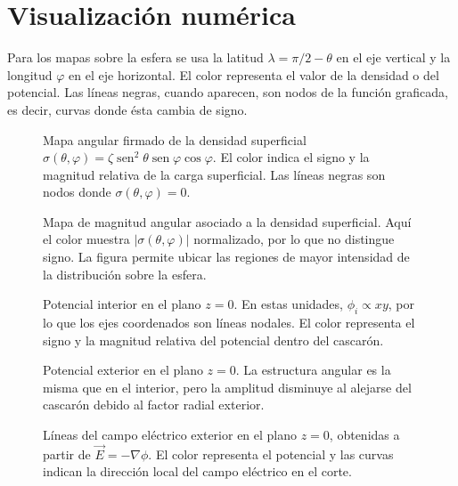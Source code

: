 \documentclass[11pt]{article}
\newcommand{\sen}{\operatorname{sen}}
\begin{document}
\section*{Visualización numérica}

Para los mapas sobre la esfera se usa la latitud $\lambda=\pi/2-\theta$ en el eje vertical y la longitud $\varphi$ en el eje horizontal. El color representa el valor de la densidad o del potencial. Las líneas negras, cuando aparecen, son nodos de la función graficada, es decir, curvas donde ésta cambia de signo.

\begin{figure}[h]
\centering

\caption{Mapa angular firmado de la densidad superficial $\sigma(\theta,\varphi)=\zeta\sen^2\theta\sen\varphi\cos\varphi$. El color indica el signo y la magnitud relativa de la carga superficial. Las líneas negras son nodos donde $\sigma(\theta,\varphi)=0$.}
\end{figure}

\begin{figure}[h]
\centering

\caption{Mapa de magnitud angular asociado a la densidad superficial. Aquí el color muestra $|\sigma(\theta,\varphi)|$ normalizado, por lo que no distingue signo. La figura permite ubicar las regiones de mayor intensidad de la distribución sobre la esfera.}
\end{figure}

\begin{figure}[h]
\centering

\caption{Potencial interior en el plano $z=0$. En estas unidades, $\phi_i\propto xy$, por lo que los ejes coordenados son líneas nodales. El color representa el signo y la magnitud relativa del potencial dentro del cascarón.}
\end{figure}

\begin{figure}[h]
\centering

\caption{Potencial exterior en el plano $z=0$. La estructura angular es la misma que en el interior, pero la amplitud disminuye al alejarse del cascarón debido al factor radial exterior.}
\end{figure}

\begin{figure}[h]
\centering

\caption{Líneas del campo eléctrico exterior en el plano $z=0$, obtenidas a partir de $\vec E=-\nabla\phi$. El color representa el potencial y las curvas indican la dirección local del campo eléctrico en el corte.}
\end{figure}
\end{document}
